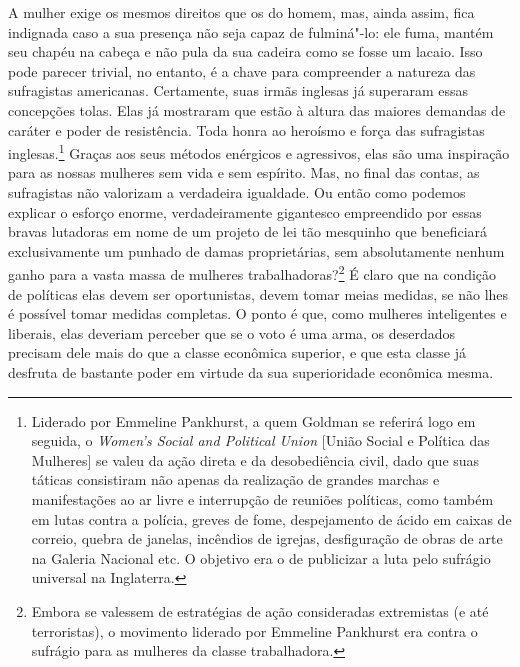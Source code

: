 A mulher exige os mesmos direitos que os do homem, mas, ainda assim,
fica indignada caso a sua presença não seja capaz de fulminá"-lo: ele
fuma, mantém seu chapéu na cabeça e não pula da sua cadeira como se fosse
um lacaio. Isso pode parecer trivial, no entanto, é a chave para
compreender a natureza das sufragistas americanas. Certamente, suas
irmãs inglesas já superaram essas concepções tolas. Elas já mostraram
que estão à altura das maiores demandas de caráter e poder de
resistência. Toda honra ao heroísmo e força das sufragistas
inglesas.\footnote{Liderado por Emmeline Pankhurst, a quem Goldman se
  referirá logo em seguida, o \emph{Women's Social and Political Union}
  {[}União Social e Política das Mulheres{]} se valeu da ação direta e da
  desobediência civil, dado que suas táticas consistiram não apenas da
  realização de grandes marchas e manifestações ao ar livre e
  interrupção de reuniões políticas, como também em lutas contra a polícia,
  greves de fome, despejamento de ácido em caixas de correio, quebra de
  janelas, incêndios de igrejas, desfiguração de obras de arte na
  Galeria Nacional etc. O objetivo era o de publicizar a luta pelo
  sufrágio universal na Inglaterra.} Graças aos seus métodos enérgicos e
agressivos, elas são uma inspiração para as nossas mulheres sem vida e
sem espírito. Mas, no final das contas, as sufragistas não valorizam a
verdadeira igualdade. Ou então como podemos explicar o esforço enorme,
verdadeiramente gigantesco empreendido por essas bravas lutadoras em nome
de um projeto de lei tão mesquinho que beneficiará exclusivamente um punhado de damas
proprietárias, sem absolutamente nenhum ganho para a vasta massa de
mulheres trabalhadoras?\footnote{Embora se valessem de estratégias de
  ação consideradas extremistas (e até terroristas), o movimento liderado por Emmeline
  Pankhurst era contra o sufrágio para as mulheres da classe
  trabalhadora.} É claro que na condição de políticas elas devem ser
oportunistas, devem tomar meias medidas, se não lhes é possível tomar
medidas completas. O ponto é que, como mulheres inteligentes e liberais, elas
deveriam perceber que se o voto é uma arma, os deserdados precisam dele
mais do que a classe econômica superior, e que esta classe já desfruta
de bastante poder em virtude da sua superioridade econômica mesma.

